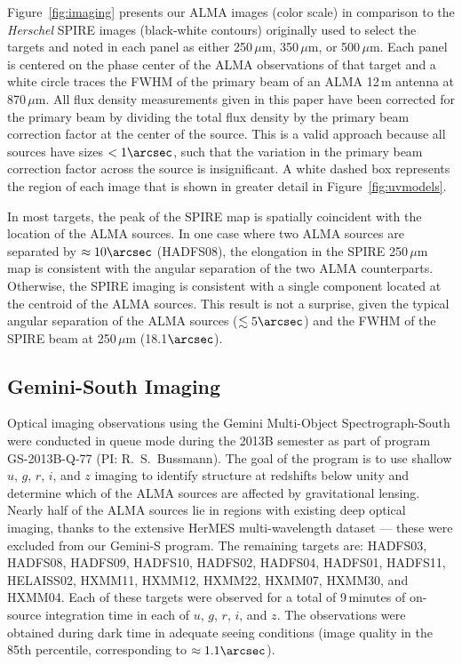 \documentclass[iop]{emulateapj}
\begin{document}
Figure~\ref{fig:imaging} presents our ALMA images (color scale) in comparison to
the {\it Herschel} SPIRE images (black-white contours) originally used to
select the targets and noted in each panel as either 250$\,\mu$m, 350$\,\mu$m,
or 500$\,\mu$m.  Each panel is centered on the phase center of the ALMA
observations of that target and a white circle traces the FWHM of the primary
beam of an ALMA 12$\,$m antenna at 870$\,\mu$m.  All flux density measurements
given in this paper have been corrected for the primary beam by dividing the
total flux density by the primary beam correction factor at the center of the
source.  This is a valid approach because all sources have sizes $< 1\arcsec$,
such that the variation in the primary beam correction factor across the source
is insignificant.  A white dashed box represents the region of each image that
is shown in greater detail in Figure~\ref{fig:uvmodels}.

In most targets, the peak of the SPIRE map is spatially coincident with the
location of the ALMA sources.  In one case where two ALMA sources are separated
by $\approx 10\arcsec$ (HADFS08), the elongation in the SPIRE 250$\,\mu$m map is
consistent with the angular separation of the two ALMA counterparts.
Otherwise, the SPIRE imaging is consistent with a single component located at
the centroid of the ALMA sources.  This result is not a surprise, given the
typical angular separation of the ALMA sources ($\lesssim 5\arcsec$) and the
FWHM of the SPIRE beam at 250$\,\mu$m (18.1$\arcsec$). 

\subsection{Gemini-South Imaging}\label{sec:geminiobs}

Optical imaging observations using the Gemini Multi-Object Spectrograph-South
\citep[GMOS-S;][]{Hook:2004qy} were conducted in queue mode during the 2013B
semester as part of program GS-2013B-Q-77 (PI: R.~S.~Bussmann).  The goal of
the program is to use shallow $u$, $g$, $r$, $i$, and $z$ imaging to identify
structure at redshifts below unity and determine which of the ALMA sources are affected by
gravitational lensing.  Nearly half of the ALMA sources lie in regions with
existing deep optical imaging, thanks to the extensive HerMES multi-wavelength
dataset --- these were excluded from our Gemini-S program.  The remaining
targets are: HADFS03, HADFS08, HADFS09, HADFS10, HADFS02, HADFS04, HADFS01,
HADFS11, HELAISS02, HXMM11, HXMM12, HXMM22, HXMM07, HXMM30, and HXMM04.  Each
of these targets were observed for a total of 9$\,$minutes of on-source
integration time in each of $u$, $g$, $r$, $i$, and $z$.  The observations were
obtained during dark time in adequate seeing conditions (image quality in
the 85th percentile, corresponding to $\approx 1.1\arcsec$).
\end{document}
